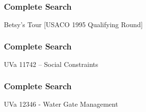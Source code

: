 \begin{frame}
\frametitle{Complete Search}
\begin{block}{Betsy's Tour [USACO 1995 Qualifying Round]}
%
\end{block}
\end{frame}

\begin{frame}
\frametitle{Complete Search}
\begin{block}{UVa 11742 -- Social Constraints}
\end{block}
\end{frame}

\begin{frame}
\frametitle{Complete Search}
\begin{block}{UVa 12346 - Water Gate Management}
\end{block}
\end{frame}

